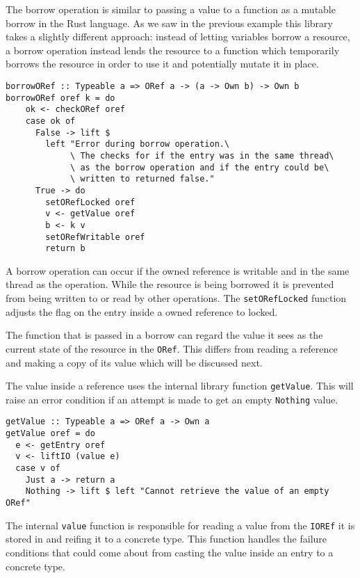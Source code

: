 \documentclass[onehalf,11pt]{beavtex}
\begin{document}
The borrow operation is similar to passing a value to a function as a mutable
borrow in the Rust language.
As we saw in the previous example this library takes a slightly different approach:
instead of letting variables borrow a resource, a borrow operation instead lends
the resource to a function which temporarily borrows the resource in order to
use it and potentially mutate it in place.

\begin{verbatim}
borrowORef :: Typeable a => ORef a -> (a -> Own b) -> Own b
borrowORef oref k = do
    ok <- checkORef oref
    case ok of
      False -> lift $
        left "Error during borrow operation.\
             \ The checks for if the entry was in the same thread\
             \ as the borrow operation and if the entry could be\
             \ written to returned false."
      True -> do
        setORefLocked oref
        v <- getValue oref
        b <- k v
        setORefWritable oref
        return b
\end{verbatim}

A borrow operation can occur if the owned reference is writable and
in the same thread as the operation.
While the resource is being borrowed it is prevented from being written to or
read by other operations. The \texttt{setORefLocked} function adjusts the flag
on the entry inside a owned reference to locked.

The function that is passed in a borrow can regard the value it sees as the
current state of the resource in the \texttt{ORef}. This differs from reading a
reference and making a copy of its value which will be discussed next.

The value inside a reference uses the internal library function
\texttt{getValue}. This will raise an error condition if an
attempt is made to get an empty \texttt{Nothing} value.

\begin{verbatim}
getValue :: Typeable a => ORef a -> Own a
getValue oref = do
  e <- getEntry oref
  v <- liftIO (value e)
  case v of
    Just a -> return a
    Nothing -> lift $ left "Cannot retrieve the value of an empty ORef"
\end{verbatim}

The internal \texttt{value} function is responsible for reading a value from
the \texttt{IOREf} it is stored in and reifing it to a concrete type.
This function handles the failure conditions that could come
about from casting the value inside an entry to a concrete type.
\end{document}
